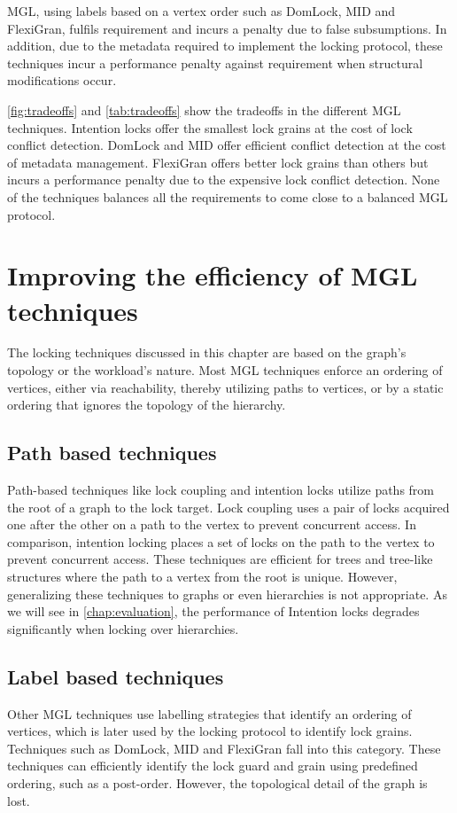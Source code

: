 MGL, using labels based on a vertex order such as DomLock, MID and FlexiGran, fulfils requirement \Rb and incurs a penalty due to false subsumptions. In addition, due to the metadata required to implement the locking protocol, these techniques incur a performance penalty against requirement \Rd when structural modifications occur. 


\cref{fig:tradeoffs} and \cref{tab:tradeoffs} show the tradeoffs in the different MGL techniques. Intention locks offer the smallest lock grains at the cost of lock conflict detection. DomLock and MID offer efficient conflict detection at the cost of metadata management. FlexiGran offers better lock grains than others but incurs a performance penalty due to the expensive lock conflict detection. None of the techniques balances all the requirements to come close to a balanced MGL protocol.



\section{Improving the efficiency of MGL techniques}

The locking techniques discussed in this chapter are based on the graph's topology or the workload's nature. Most MGL techniques enforce an ordering of vertices, either via reachability, thereby utilizing paths to vertices, or by a static ordering that ignores the topology of the hierarchy.

\subsection{Path based techniques}
Path-based techniques like lock coupling \cite{DBLP:journals/acta/BayerS77}  and intention locks \cite{gray1975granularity} utilize paths from the root of a graph to the lock target. Lock coupling uses a pair of locks acquired one after the other on a path to the vertex to prevent concurrent access. In comparison, intention locking places a set of locks on the path to the vertex to prevent concurrent access. These techniques are efficient for trees and tree-like structures where the path to a vertex from the root is unique. However, generalizing these techniques to graphs or even hierarchies is not appropriate. As we will see in \cref{chap:evaluation}, the performance of Intention locks degrades significantly when locking over hierarchies.

\subsection{Label based techniques}
Other MGL techniques use labelling strategies that identify an ordering of vertices, which is later used by the locking protocol to identify lock grains. Techniques such as DomLock, MID and FlexiGran fall into this category. These techniques can efficiently identify the lock guard and grain using predefined ordering, such as a post-order. However, the topological detail of the graph is lost.  


